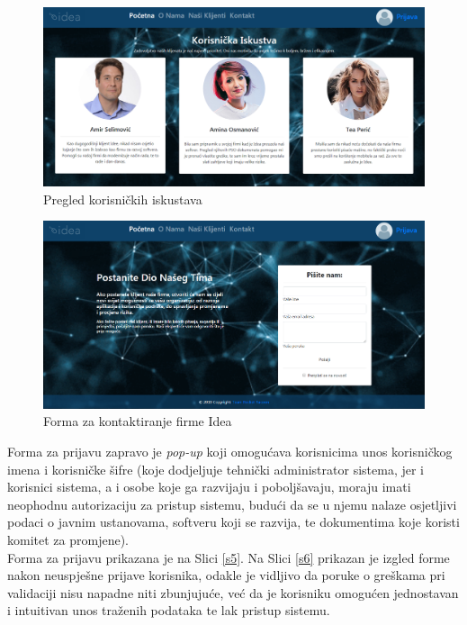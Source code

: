 \documentclass[12pt,a4paper]{article}
\begin{document}
\begin{figure}[H]
\center
\includegraphics[scale=0.35]{../res/UI/clients.PNG}
\caption{Pregled korisničkih iskustava}
\label{s3}
\end{figure}

\begin{figure}[H]
\center
\includegraphics[scale=0.35]{../res/UI/contact.PNG}
\caption{Forma za kontaktiranje firme Idea}
\label{s4}
\end{figure}

Forma za prijavu zapravo je \textit{pop-up} koji omogućava korisnicima unos korisničkog imena i korisničke šifre (koje dodjeljuje tehnički administrator sistema, jer i korisnici sistema, a i osobe koje ga razvijaju i poboljšavaju, moraju imati neophodnu autorizaciju za pristup sistemu, budući da se u njemu nalaze osjetljivi podaci o javnim ustanovama, softveru koji se razvija, te dokumentima koje koristi komitet za promjene). \\

Forma za prijavu prikazana je na Slici \ref{s5}. Na Slici \ref{s6} prikazan je izgled forme nakon neuspješne prijave korisnika, odakle je vidljivo da poruke o greškama pri validaciji nisu napadne niti zbunjujuće, već da je korisniku omogućen jednostavan i intuitivan unos traženih podataka te lak pristup sistemu.
\end{document}
